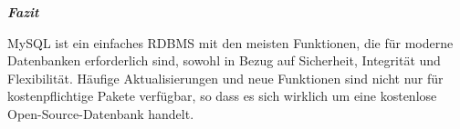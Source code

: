\begin{large} \emph{\textbf{Fazit}} \end{large}
MySQL ist ein einfaches RDBMS mit den meisten Funktionen, die für moderne Datenbanken erforderlich 
sind, sowohl in Bezug auf Sicherheit, Integrität und Flexibilität. Häufige Aktualisierungen und neue
Funktionen sind nicht nur für kostenpflichtige Pakete verfügbar, so dass es sich wirklich um eine
kostenlose Open-Source-Datenbank handelt. 